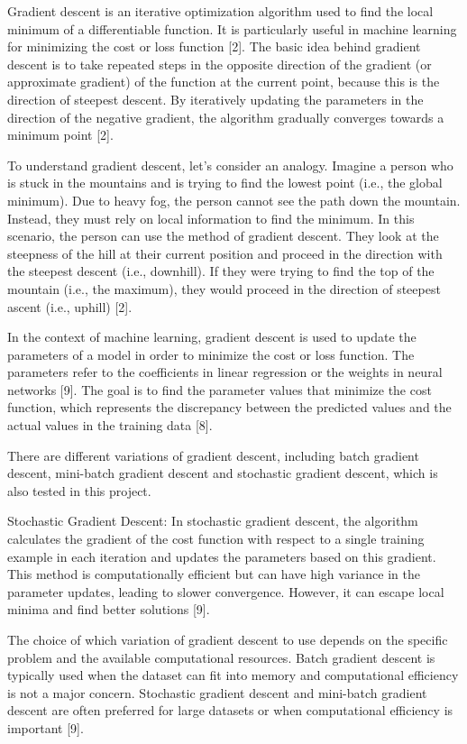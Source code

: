 \documentclass[inscr,ack,preface]{diphdthesis}
\begin{document}
Gradient descent is an iterative optimization algorithm used to find the local minimum of a differentiable function. It is particularly useful in machine learning for minimizing the cost or loss function [2]. The basic idea behind gradient descent is to take repeated steps in the opposite direction of the gradient (or approximate gradient) of the function at the current point, because this is the direction of steepest descent. By iteratively updating the parameters in the direction of the negative gradient, the algorithm gradually converges towards a minimum point [2].

To understand gradient descent, let's consider an analogy. Imagine a person who is stuck in the mountains and is trying to find the lowest point (i.e., the global minimum). Due to heavy fog, the person cannot see the path down the mountain. Instead, they must rely on local information to find the minimum. In this scenario, the person can use the method of gradient descent. They look at the steepness of the hill at their current position and proceed in the direction with the steepest descent (i.e., downhill). If they were trying to find the top of the mountain (i.e., the maximum), they would proceed in the direction of steepest ascent (i.e., uphill) [2].

In the context of machine learning, gradient descent is used to update the parameters of a model in order to minimize the cost or loss function. The parameters refer to the coefficients in linear regression or the weights in neural networks [9]. The goal is to find the parameter values that minimize the cost function, which represents the discrepancy between the predicted values and the actual values in the training data [8].

There are different variations of gradient descent, including batch gradient descent, mini-batch gradient descent and stochastic gradient descent, which is also tested in this project.

    Stochastic Gradient Descent: In stochastic gradient descent, the algorithm calculates the gradient of the cost function with respect to a single training example in each iteration and updates the parameters based on this gradient. This method is computationally efficient but can have high variance in the parameter updates, leading to slower convergence. However, it can escape local minima and find better solutions [9].

The choice of which variation of gradient descent to use depends on the specific problem and the available computational resources. Batch gradient descent is typically used when the dataset can fit into memory and computational efficiency is not a major concern. Stochastic gradient descent and mini-batch gradient descent are often preferred for large datasets or when computational efficiency is important [9].
\end{document}
